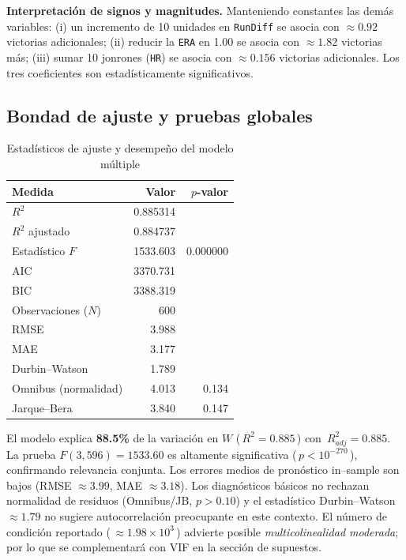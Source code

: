 \documentclass[man,floatsintext]{apa7}
\begin{document}
\noindent \textbf{Interpretación de signos y magnitudes.} Manteniendo constantes las demás variables: (i) un incremento de 10 unidades en \texttt{RunDiff} se asocia con \(\approx 0.92\) victorias adicionales; (ii) reducir la \texttt{ERA} en 1.00 se asocia con \(\approx 1.82\) victorias más; (iii) sumar 10 jonrones (\texttt{HR}) se asocia con \(\approx 0.156\) victorias adicionales. Los tres coeficientes son estadísticamente significativos.

\subsection{Bondad de ajuste y pruebas globales}
\begin{table}[H]
    \centering
    \caption{Estadísticos de ajuste y desempeño del modelo múltiple}
    \label{tab:ols_multi_fit}
    \begin{tabular}{lrr}
        \toprule
        Medida & Valor & $p$-valor \\
        \midrule
        $R^2$ & 0.885314 & \\
        $R^2$ ajustado & 0.884737 & \\
        Estadístico $F$ & 1533.603 & 0.000000 \\
        AIC & 3370.731 & \\
        BIC & 3388.319 & \\
        Observaciones ($N$) & 600 & \\
        RMSE & 3.988 & \\
        MAE & 3.177 & \\
        Durbin--Watson & 1.789 & \\
        Omnibus (normalidad) & 4.013 & 0.134 \\
        Jarque--Bera & 3.840 & 0.147 \\
        \bottomrule
    \end{tabular}
\end{table}

\noindent El modelo explica \textbf{88.5\%} de la variación en $W$ (\,$R^2=0.885$\,) con \,$R^2_{adj}=0.885$. La prueba $F(3,596)=1533.60$ es altamente significativa (\,$p<10^{-270}$\,), confirmando relevancia conjunta. Los errores medios de pronóstico in--sample son bajos (RMSE $\approx 3.99$, MAE $\approx 3.18$). Los diagnósticos básicos no rechazan normalidad de residuos (Omnibus/JB, $p>0.10$) y el estadístico Durbin--Watson $\approx 1.79$ no sugiere autocorrelación preocupante en este contexto. El número de condición reportado (\,$\approx 1.98\times10^3$\,) advierte posible \emph{multicolinealidad moderada}; por lo que se complementará con VIF en la sección de supuestos.
\end{document}
